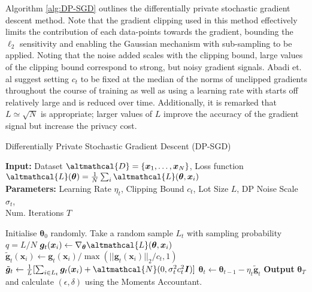 Algorithm \ref{alg:DP-SGD} outlines the differentially private stochastic gradient descent method. Note that the gradient clipping used in this method effectively limits the contribution of each data-points towards the gradient, bounding the $\ell_2$ sensitivity and enabling the Gaussian mechanism with sub-sampling to be applied. Noting that the noise added scales with the clipping bound, large values of the clipping bound correspond to strong, but noisy gradient signals. Abadi et. al suggest setting $c_t$ to be fixed at the median of the norms of unclipped gradients throughout the course of training as well as using a learning rate with starts off relatively large and is reduced over time. Additionally, it is remarked that $L \simeq \sqrt{N}$ is appropriate; larger values of $L$ improve the accuracy of the gradient signal but increase the privacy cost. \cite{moments_account}

\begin{algorithm}
	\caption{Differentially Private Stochastic Gradient Descent (DP-SGD)}
	\label{alg:DP-SGD}
	\hspace*{\algorithmicindent} \textbf{Input:} Dataset $\altmathcal{D} = \lbrace \bm{x}_1, \ldots, \bm{x}_N \rbrace$, Loss function $\altmathcal{L}(\bm{\theta}) = \frac{1}{N} \sum_i \altmathcal{L}(\bm{\theta}, \bm{x}_i)$ \\
	\hspace*{\algorithmicindent} \textbf{Parameters:} Learning Rate $\eta_t$, Clipping Bound $c_t$, Lot Size $L$, DP Noise Scale $\sigma_t$, \\ 	\hspace*{\algorithmicindent} Num. Iterations $T$ 
	\begin{algorithmic}[1] %
		\State Initialise $\bm{\theta}_0$ randomly. 
		\State Take a random sample $L_t$ with sampling probability $q = L / N$
		 
		\State $\bm{g}_t(\bm{x}_i) \leftarrow \nabla_{\bm{\theta}} \altmathcal{L}(\bm{\theta}, \bm{x}_i)$
		\State $\tilde{\bm{g}}_t(\bm{x}_i) \leftarrow \bm{g}_t(\bm{x}_i) / \max(||\bm{g}_t(\bm{x}_i)||_2/c_t, 1)$ 
		\EndFor
				\State $\tilde{\bm{g}}_t \leftarrow \frac{1}{L} [\sum_{i \in L_t} \bm{g}_t(\bm{x}_i) + \altmathcal{N}(0, \sigma_t^2 c_t^2 \bm{I})] $ 
				\State $\bm{\theta}_t \leftarrow \bm{\theta}_{t-1} - \eta_t \tilde{\bm{g}}_t$
		\EndFor
		\State \textbf{Output} $\bm{\theta}_T$ and calculate $(\epsilon, \delta)$ using the Moments Accountant. 
	\end{algorithmic}
\end{algorithm}

